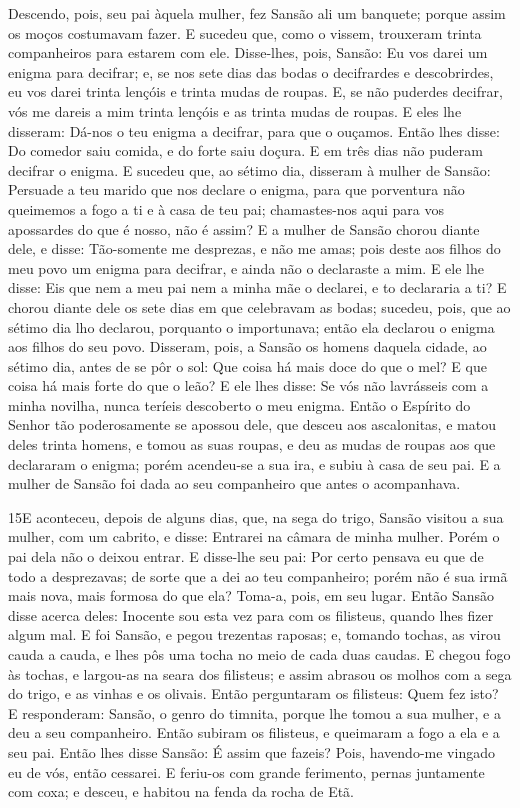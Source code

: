 Descendo, pois, seu pai àquela mulher, fez Sansão ali um
banquete; porque assim os moços costumavam fazer. E sucedeu
que, como o vissem, trouxeram trinta companheiros para estarem com
ele. Disse-lhes, pois, Sansão: Eu vos darei um enigma para
decifrar; e, se nos sete dias das bodas o decifrardes e
descobrirdes, eu vos darei trinta lençóis e trinta mudas de roupas.
E, se não puderdes decifrar, vós me dareis a mim trinta
lençóis e as trinta mudas de roupas. E eles lhe disseram: Dá-nos o
teu enigma a decifrar, para que o ouçamos. Então lhes disse:
Do comedor saiu comida, e do forte saiu doçura. E em três dias não
puderam decifrar o enigma. E sucedeu que, ao sétimo dia,
disseram à mulher de Sansão: Persuade a teu marido que nos declare o
enigma, para que porventura não queimemos a fogo a ti e à casa de
teu pai; chamastes-nos aqui para vos apossardes do que é nosso, não
é assim? E a mulher de Sansão chorou diante dele, e disse:
Tão-somente me desprezas, e não me amas; pois deste aos filhos do
meu povo um enigma para decifrar, e ainda não o declaraste a mim. E
ele lhe disse: Eis que nem a meu pai nem a minha mãe o declarei, e
to declararia a ti? E chorou diante dele os sete dias em que
celebravam as bodas; sucedeu, pois, que ao sétimo dia lho declarou,
porquanto o importunava; então ela declarou o enigma aos filhos do
seu povo. Disseram, pois, a Sansão os homens daquela cidade,
ao sétimo dia, antes de se pôr o sol: Que coisa há mais doce do que
o mel? E que coisa há mais forte do que o leão? E ele lhes disse: Se
vós não lavrásseis com a minha novilha, nunca teríeis descoberto o
meu enigma. Então o Espírito do Senhor tão poderosamente se
apossou dele, que desceu aos ascalonitas, e matou deles trinta
homens, e tomou as suas roupas, e deu as mudas de roupas aos que
declararam o enigma; porém acendeu-se a sua ira, e subiu à casa de
seu pai. E a mulher de Sansão foi dada ao seu companheiro que
antes o acompanhava.

\medskip

\lettrine{15} E aconteceu, depois de alguns dias, que, na sega
do trigo, Sansão visitou a sua mulher, com um cabrito, e disse:
Entrarei na câmara de minha mulher. Porém o pai dela não o deixou
entrar. E disse-lhe seu pai: Por certo pensava eu que de todo a
desprezavas; de sorte que a dei ao teu companheiro; porém não é sua
irmã mais nova, mais formosa do que ela? Toma-a, pois, em seu lugar.
Então Sansão disse acerca deles: Inocente sou esta vez para com
os filisteus, quando lhes fizer algum mal. E foi Sansão, e pegou
trezentas raposas; e, tomando tochas, as virou cauda a cauda, e lhes
pôs uma tocha no meio de cada duas caudas. E chegou fogo às
tochas, e largou-as na seara dos filisteus; e assim abrasou os
molhos com a sega do trigo, e as vinhas e os olivais. Então
perguntaram os filisteus: Quem fez isto? E responderam: Sansão, o
genro do timnita, porque lhe tomou a sua mulher, e a deu a seu
companheiro. Então subiram os filisteus, e queimaram a fogo a ela e
a seu pai. Então lhes disse Sansão: É assim que fazeis? Pois,
havendo-me vingado eu de vós, então cessarei. E feriu-os com
grande ferimento, pernas juntamente com coxa; e desceu, e habitou na
fenda da rocha de Etã.

